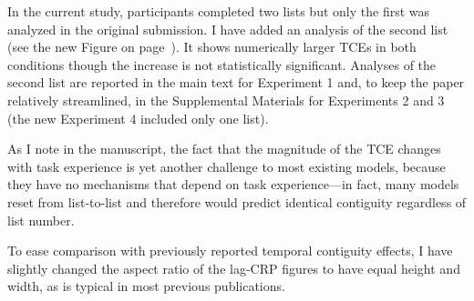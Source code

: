 \documentclass[12pt]{article}
\begin{document}
\begin{enumerate}
	In the current study, participants completed two lists but only the first was analyzed in the original submission. I have added an analysis of the second list (see the new Figure on page~\pageref{TODO-6}). It shows numerically larger TCEs in both conditions though the increase is not statistically significant. Analyses of the second list are reported in the main text for Experiment 1 and, to keep the paper relatively streamlined, in the Supplemental Materials for Experiments 2 and 3 (the new Experiment 4 included only one list).

	As I note in the manuscript, the fact that the magnitude of the TCE changes with task experience is yet another challenge to most existing models, because they have no mechanisms that depend on task experience---in fact, many models reset from list-to-list and therefore would predict identical contiguity regardless of list number.

	To ease comparison with previously reported temporal contiguity effects, I have slightly changed the aspect ratio of the lag-CRP figures to have equal height and width, as is typical in most previous publications.


\end{enumerate}
\end{document}

